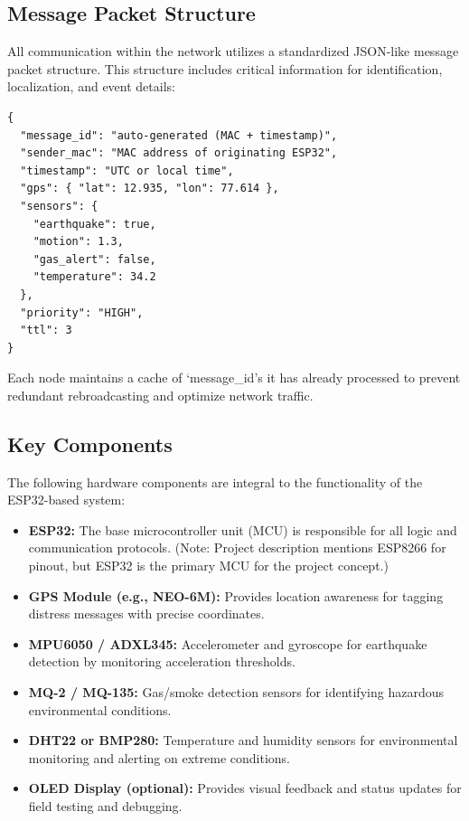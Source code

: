 \documentclass[12pt, a4paper]{article}
\begin{document}
\subsection{Message Packet Structure}
All communication within the network utilizes a standardized JSON-like message packet structure. This structure includes critical information for identification, localization, and event details:
\begin{lstlisting}[caption=SOS Message Packet Structure]
{
  "message_id": "auto-generated (MAC + timestamp)",
  "sender_mac": "MAC address of originating ESP32",
  "timestamp": "UTC or local time",
  "gps": { "lat": 12.935, "lon": 77.614 },
  "sensors": {
    "earthquake": true,
    "motion": 1.3,
    "gas_alert": false,
    "temperature": 34.2
  },
  "priority": "HIGH",
  "ttl": 3
}
\end{lstlisting}
Each node maintains a cache of `message\_id's it has already processed to prevent redundant rebroadcasting and optimize network traffic.

\subsection{Key Components}
The following hardware components are integral to the functionality of the ESP32-based system:
\begin{itemize}
    \item \textbf{ESP32:} The base microcontroller unit (MCU) is responsible for all logic and communication protocols. (Note: Project description mentions ESP8266 for pinout, but ESP32 is the primary MCU for the project concept.)
    \item \textbf{GPS Module (e.g., NEO-6M):} Provides location awareness for tagging distress messages with precise coordinates.
    \item \textbf{MPU6050 / ADXL345:} Accelerometer and gyroscope for earthquake detection by monitoring acceleration thresholds.
    \item \textbf{MQ-2 / MQ-135:} Gas/smoke detection sensors for identifying hazardous environmental conditions.
    \item \textbf{DHT22 or BMP280:} Temperature and humidity sensors for environmental monitoring and alerting on extreme conditions.
    \item \textbf{OLED Display (optional):} Provides visual feedback and status updates for field testing and debugging.
\end{itemize}

\end{document}

